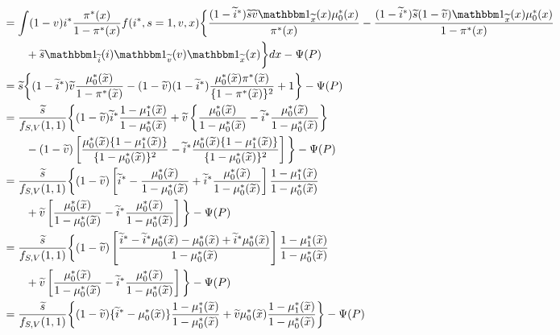 \documentclass{article}
\begin{document}
\begin{align*}
   &= \int (1 - v)i^* \dfrac{\pi^*(x)}{1 - \pi^*(x)}f(i^*, s=1, v, x) \bigg\{\dfrac{(1-\widetilde{i}^*)\widetilde{s}\widetilde{v}\mathbbm 1_{\widetilde{x}}(x)\mu^*_0(x)}{\pi^*(x)} - \dfrac{(1-\widetilde{i}^*)\widetilde{s}(1-\widetilde{v})\mathbbm 1_{\widetilde{x}}(x)\mu^*_0(x)}{1 - \pi^*(x)} \\
   &\qquad + \widetilde s \mathbbm 1_{\widetilde{i}}(i)\mathbbm 1_{\widetilde{v}}(v)\mathbbm 1_{\widetilde{x}}(x) \bigg\} dx - \Psi(P) \\
   &=\widetilde s\bigg\{(1-\widetilde{i}^*)\widetilde{v}\dfrac{\mu^*_0(\widetilde x)}{1 - \pi^*(\widetilde x)} -  (1 - \widetilde v) (1 - \widetilde i^*)\dfrac{\mu^*_0(\widetilde x) \pi^*(\widetilde x)}{\{1 - \pi^*(\widetilde x)\}^2} + 1 \bigg\}  - \Psi(P) \\
   &=\dfrac{\widetilde s}{f_{S,V}(1, 1)}  \bigg\{(1 - \widetilde v)\widetilde i^*\dfrac{1 - \mu^*_1(\widetilde x)}{1 - \mu^*_0(\widetilde x)} + \widetilde v \left\{\dfrac{\mu^*_0(\widetilde x)}{1 - \mu^*_0(\widetilde x)} - \widetilde i^* \dfrac{\mu^*_0(\widetilde x)}{1 - \mu^*_0(\widetilde x)}\right\} \\
   &\qquad -  (1 - \widetilde v) \left[\dfrac{\mu^*_0(\widetilde x)\{1 - \mu^*_1(\widetilde x)\}}{\{1 - \mu^*_0(\widetilde x)\}^2} - \widetilde i^*\dfrac{\mu^*_0(\widetilde x)\{1 - \mu^*_1(\widetilde x)\}}{\{1 - \mu^*_0(\widetilde x)\}^2}\right]  \bigg\}  - \Psi(P) \\
   &=\dfrac{\widetilde s}{f_{S,V}(1, 1)}  \bigg\{(1 - \widetilde v) \left[\widetilde i^* - \dfrac{\mu^*_0(\widetilde x)}{1 - \mu^*_0(\widetilde x)}  + \widetilde i^*\dfrac{\mu^*_0(\widetilde x)}{1 - \mu^*_0(\widetilde x)}\right]\dfrac{1 - \mu^*_1(\widetilde x)}{1 - \mu^*_0(\widetilde x)}\\
   &\qquad   + \widetilde v \left[\dfrac{\mu^*_0(\widetilde x)}{1 - \mu^*_0(\widetilde x)} - \widetilde i^* \dfrac{\mu^*_0(\widetilde x)}{1 - \mu^*_0(\widetilde x)}\right] \bigg\}  - \Psi(P) \\
   &=\dfrac{\widetilde s}{f_{S,V}(1, 1)}  \bigg\{(1 - \widetilde v) \left[ \dfrac{\widetilde i^* - \widetilde i^* \mu^*_0(\widetilde x) - \mu^*_0(\widetilde x) + \widetilde i^* \mu^*_0(\widetilde x)}{1 - \mu^*_0(\widetilde x)}\right]\dfrac{1 - \mu^*_1(\widetilde x)}{1 - \mu^*_0(\widetilde x)} \\
   &\qquad + \widetilde v \left[\dfrac{\mu^*_0(\widetilde x)}{1 - \mu^*_0(\widetilde x)} - \widetilde i^* \dfrac{\mu^*_0(\widetilde x)}{1 - \mu^*_0(\widetilde x)}\right]   \bigg\}  - \Psi(P) \\
   &=\dfrac{\widetilde s}{f_{S,V}(1, 1)}  \bigg\{(1 - \widetilde v) \{\widetilde i^* - \mu^*_0(\widetilde x)\}\dfrac{1 - \mu^*_1(\widetilde x)}{1 - \mu^*_0(\widetilde x)} + \widetilde v \mu^*_0(\widetilde x) \dfrac{1 - \mu^*_1(\widetilde x)}{1 - \mu^*_0(\widetilde x)}  \bigg\}  - \Psi(P) 
\end{align*}
\end{document}
